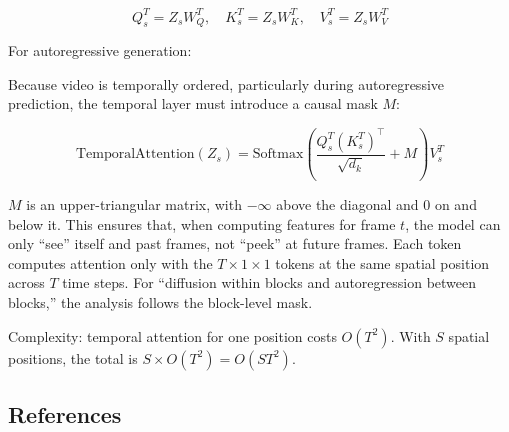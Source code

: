 \[
Q_s^T=Z_sW_Q^T,\quad K_s^T=Z_sW_K^T,\quad V_s^T=Z_sW_V^T
\]

For autoregressive generation:

Because video is temporally ordered, particularly during autoregressive prediction, the temporal layer must introduce a causal mask \(M\):

\[
\mathrm{TemporalAttention}(Z_s)=\mathrm{Softmax}\left(\frac{Q_s^T(K_s^T)^\top}{\sqrt{d_k}}+M\right)V_s^T
\]

\(M\) is an upper-triangular matrix, with \(-\infty\) above the diagonal and 0 on and below it. This ensures that, when computing features for frame \(t\), the model can only ``see'' itself and past frames, not ``peek'' at future frames. Each token computes attention only with the \(T\times 1\times 1\) tokens at the same spatial position across \(T\) time steps.
For ``diffusion within blocks and autoregression between blocks,'' the analysis follows the block-level mask.

Complexity: temporal attention for one position costs \(O(T^2)\). With \(S\) spatial positions, the total is \(S\times O(T^2)=O(ST^2)\).

\FloatBarrier
{}
\hypertarget{references-138}{%
\subsection{References}\label{references-138}}

